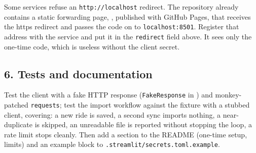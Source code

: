 \begin{tip}
Some services refuse an \texttt{http://localhost} redirect. The repository already contains a static forwarding page,
, published with GitHub Pages, that receives the https redirect and passes the code on to
\texttt{localhost:8501}. Register that address with the service and put it in the \texttt{redirect} field above.
It sees only the one-time code, which is useless without the client secret.
\end{tip}

\subsection*{6. Tests and documentation}

Test the client with a fake HTTP response (\texttt{FakeResponse} in ) and monkey-patched
\texttt{requests}; test the import workflow against the  fixture with a stubbed client, covering: a
new ride is saved, a second sync imports nothing, a near-duplicate is skipped, an unreadable file is reported without
stopping the loop, a rate limit stops cleanly. Then add a section to the README (one-time setup, limits) and an
example block to \texttt{.streamlit/secrets.toml.example}.

